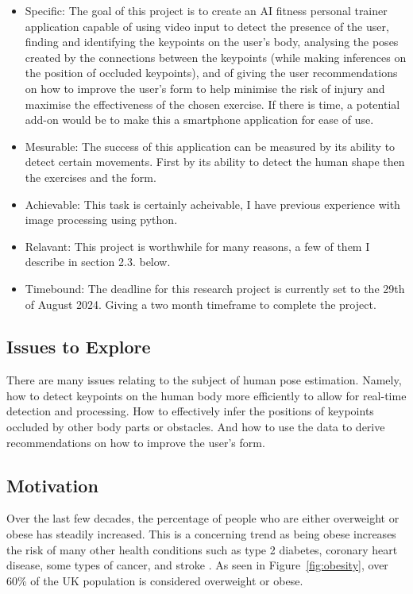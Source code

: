 \documentclass[runningheads]{llncs}
\begin{document}
        \begin{itemize}
            \item Specific: The goal of this project is to create an AI fitness personal trainer application capable of using video input to detect the presence of the user, finding and identifying the keypoints on the user's body, analysing the poses created by the connections between the keypoints (while making inferences on the position of occluded keypoints), and of giving the user recommendations on how to improve the user's form to help minimise the risk of injury and maximise the effectiveness of the chosen exercise. If there is time, a potential add-on would be to make this a smartphone application for ease of use.
            \item Mesurable: The success of this application can be measured by its ability to detect certain movements. First by its ability to detect the human shape then the exercises and the form.
            \item Achievable: This task is certainly acheivable, I have previous experience with image processing using python.
            \item Relavant: This project is worthwhile for many reasons, a few of them I describe in section 2.3. below.
            \item Timebound: The deadline for this research project is currently set to the 29th of August 2024. Giving a two month timeframe to complete the project.
        \end{itemize}    

    \subsection{Issues to Explore}
        There are many issues relating to the subject of human pose estimation. Namely, how to detect keypoints on the human body more efficiently to allow for real-time detection and processing. How to effectively infer the positions of keypoints occluded by other body parts or obstacles. And how to use the data to derive recommendations on how to improve the user's form.

    \subsection{Motivation}
        Over the last few decades, the percentage of people who are either overweight or obese has steadily increased. This is a concerning trend as being obese increases the risk of many other health conditions such as type 2 diabetes, coronary heart disease, some types of cancer, and stroke \parencite{NHS-obesity}. As seen in Figure~\ref{fig:obesity}, over 60\% of the UK population is considered overweight or obese. \\
\end{document}
